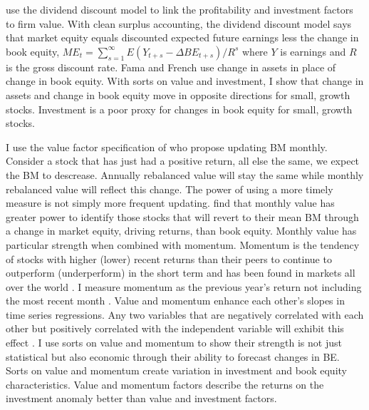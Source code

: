\textcite{fama2006profitability} use the dividend discount model to link the
profitability and investment factors to firm value.
With clean surplus accounting, the dividend discount model says that market
equity equals discounted expected future earnings less the change in book
equity,
$ME_t = \sum_{s=1}^\infty E(Y_{t+s}-\Delta BE_{t+s})/R^s$
where $Y$ is earnings and $R$ is the gross discount rate.
Fama and French use change in assets in place of change in book equity.
With sorts on value and investment, I show that change in assets and change in
book equity move in opposite directions for small, growth stocks.
Investment is a poor proxy for changes in book equity for small, growth stocks.

I use the value factor specification of \textcite{asness2013devil} who propose
updating BM monthly.
Consider a stock that has just had a positive return, all else the same, we
expect the BM to descrease.
Annually rebalanced value will stay the same while monthly rebalanced value
will reflect this change.
The power of using a more timely measure is not simply more frequent updating.
\textcite{kok2017facts} find that monthly value has greater power to identify
those stocks that will revert to their mean BM through a change in market
equity, driving returns, than book equity.
Monthly value has particular strength when combined with momentum.
Momentum is the tendency of stocks with higher (lower) recent returns than
their peers to continue to outperform (underperform) in the short term
\parencite{jegadeesh1993returns} and has been found in markets all over
the world \parencite{asness2013value}.
I measure momentum as the previous year's return not including the most recent
month \parencite{fama2016dissecting}.
Value and momentum enhance each other's slopes in time series regressions.
Any two variables that are negatively correlated with each other but positively
correlated with the independent variable will exhibit this effect
\parencite{fama2015incremental}.
I use sorts on value and momentum to show their strength is not just
statistical but also economic through their ability to forecast changes in BE.
Sorts on value and momentum create variation in investment and book equity
characteristics.
Value and momentum factors describe the returns on the investment anomaly
better than value and investment factors.

